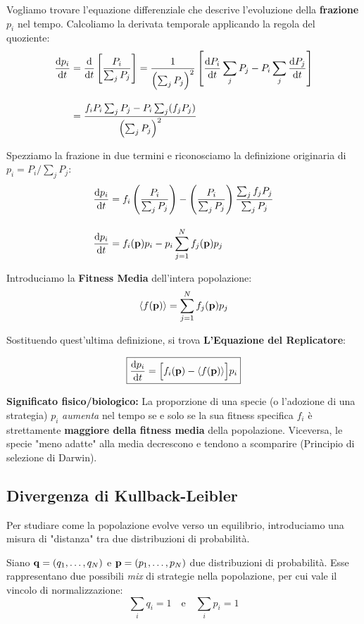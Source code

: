 \documentclass[openany]{book}
\theoremstyle{definition}
\theoremstyle{remark}
\begin{document}
Vogliamo trovare l'equazione differenziale che descrive l'evoluzione della \textbf{frazione} $p_i$ nel tempo. Calcoliamo la derivata temporale applicando la regola del quoziente:
\begin{align*}
    \dv{p_i}{t} &= \dv{t} \left[ \frac{P_i}{\sum_j P_j} \right] = \frac{1}{\left( \sum_j P_j \right)^2} \left[ \dv{P_i}{t} \sum_j P_j - P_i \sum_j \dv{P_j}{t} \right] \\[10pt]
    &= \frac{f_i P_i \sum_j P_j - P_i \sum_j (f_j P_j)}{\left( \sum_j P_j \right)^2}
\end{align*}

Spezziamo la frazione in due termini e riconosciamo la definizione originaria di $p_i = P_i / \sum_j P_j$:
\begin{align*}
    \dv{p_i}{t} &= f_i \left( \frac{P_i}{\sum_j P_j} \right) - \left( \frac{P_i}{\sum_j P_j} \right) \frac{\sum_j f_j P_j}{\sum_j P_j} \\[10pt]
    \dv{p_i}{t} &= f_i(\vb{p}) p_i - p_i \sum_{j=1}^N f_j(\vb{p}) p_j
\end{align*}

Introduciamo la \textbf{Fitness Media} dell'intera popolazione:
\begin{equation}
    \langle f(\vb{p}) \rangle = \sum_{j=1}^N f_j(\vb{p}) p_j
\end{equation}

Sostituendo quest'ultima definizione, si trova  \textbf{L'Equazione del Replicatore}:


\begin{equation}
    \boxed{\dv{p_i}{t} = \Big[ f_i(\vb{p}) - \langle f(\vb{p}) \rangle \Big] p_i}
\end{equation}

\textbf{Significato fisico/biologico:} La proporzione di una specie (o l'adozione di una strategia) $p_i$ \textit{aumenta} nel tempo se e solo se la sua fitness specifica $f_i$ è strettamente \textbf{maggiore della fitness media} della popolazione. Viceversa, le specie "meno adatte" alla media decrescono e tendono a scomparire (Principio di selezione di Darwin).


\subsection*{Divergenza di Kullback-Leibler}
Per studiare come la popolazione evolve verso un equilibrio, introduciamo una misura di "distanza" tra due distribuzioni di probabilità.

Siano $\vb{q} = (q_1, \dots, q_N)$ e $\vb{p} = (p_1, \dots, p_N)$ due distribuzioni di probabilità. Esse rappresentano due possibili \textit{mix} di strategie nella popolazione, per cui vale il vincolo di normalizzazione:
$$ \sum_{i} q_i = 1 \quad \text{e} \quad \sum_{i} p_i = 1 $$
\end{document}
